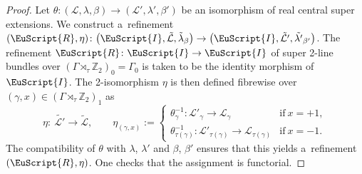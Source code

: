 \documentclass[pdftex]{sigma}
\numberwithin{equation}{section}
\def\mathscr#1{\EuScript{#1}}
\def\Z {\mathbb{Z}}
\begin{document}
\begin{proof}
 Let $\theta \colon (\mathcal{L},\lambda,\beta) \to (\mathcal{L}',\lambda',\beta')$ be an isomorphism of real central super extensions. We construct a~refinement $(\mathscr{R},\eta) \colon \bigl(\mathscr{I},\tilde{\mathcal{L}},\tilde{\lambda}_{\beta}\bigr) \to \bigl(\mathscr{I},\tilde{\mathcal{L}'},\tilde{\lambda'}_{\beta'}\bigr)$. The refinement
 $\mathscr{R} \colon \mathscr{I} \to \mathscr{I}$ of super 2-line bundles over $(\Gamma \rtimes_{\tau} \Z_2)_0 = \Gamma_0$ is taken to be the identity morphism
 of $\mathscr{I}$. The 2-isomorphism $\eta$ is then defined fibrewise over $(\gamma,x) \in (\Gamma \rtimes_{\tau} \Z_2)_1$ as
 \[
 \eta \colon\ \tilde{\mathcal{L}'} \to \tilde{\mathcal{L}}, \qquad \eta_{(\gamma,x)} :=
 \begin{cases}
 \theta_{\gamma}^{-1} \colon \mathcal{L}'_\gamma \to \mathcal{L}_\gamma & \text{if} \ x=+1, \\
 \theta_{\tau(\gamma)}^{-1} \colon \mathcal{L}'_{\tau(\gamma)} \to \mathcal{L}_{\tau(\gamma)} & \text{if} \ x=-1.
 \end{cases}
 \]
 The compatibility of $\theta$ with $\lambda$, $\lambda'$ and $\beta$, $\beta'$ ensures that this yields a~refinement $(\mathscr{R},\eta)$.
 One checks that the assignment is functorial.


\end{proof}
\end{document}
